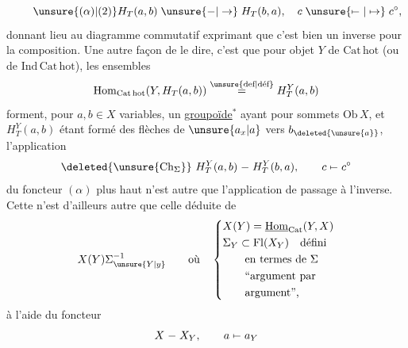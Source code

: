 \[
\tag*{$\unsure{(\alpha)|(2)}$}
H_T(a,b)\mathrel{\unsure{-|\to}}H_T(b,a),\quad c\mathrel{\unsure{\mapstochar\relbar|\mapsto}}c^\circ,
\]
donnant lieu au diagramme commutatif exprimant que c'est bien un inverse pour la composition. Une autre façon de le dire, c'est que pour  objet $Y$ de $\mathrm{Cat\,hot}$ (ou de $\mathrm{Ind\,Cat\,hot}$),  les ensembles
\[
\mathrm{Hom}_{\mathrm{Cat\,hot}}(Y,H_T(a,b))\overset{\text{\unsure{def|déf}}}{=}H_T^Y(a,b)
\]
forment, pour $a,b\in X$ variables, un \uline{groupoïde}$^{*}$  ayant pour  sommets $\mathrm{Ob}\,X$, et $H_T^Y(a,b)$ étant formé des flèches de $\unsure{a_x|a}$ vers $b_{\deleted{\unsure{a}}}$,   l'application
\[
\deleted{\unsure{\mathrm{Ch}_{\Sigma}}}\ H_T^Y(a,b)\mathrel{-}H_T^Y(b,a),\qquad c\mathrel{\mapstochar\relbar}c^\circ
\]
  du foncteur $(\alpha)$ plus haut n'est autre que l'application de passage à l'inverse. Cette   n'est d'ailleurs autre que celle déduite de
\[
X(Y)\Sigma_{\unsure{Y|y}}^{-1}\qquad\text{où}\quad
\left\{\begin{aligned}
&X(Y)=\underline{\mathrm{Hom}}_{\mathrm{Cat}}(Y,X)\\
&\Sigma_Y\subset\mathrm{Fl}(X_Y)\quad\text{défini}\\
&\qquad\text{en termes de }\Sigma\\
&\qquad\text{``argument par}\\
&\qquad\text{argument'',}
\end{aligned}\right.
\]
à l'aide du  foncteur
\[
X\mathrel{-}X_Y,\qquad a\mathrel{\mapstochar\relbar}a_Y
\]

